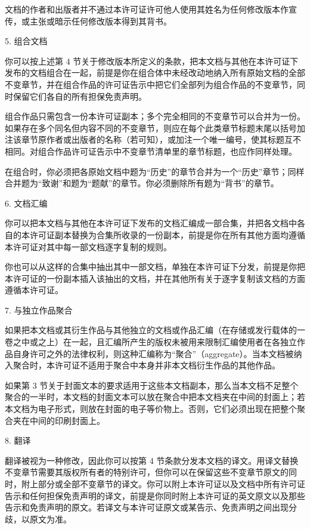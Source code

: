 \documentclass[a4paper]{rapport3}
\begin{document}
文档的作者和出版者并不通过本许可证许可他人使用其姓名为任何修改版本作宣传，或主张或暗示任何修改版本得到其背书。

5. 组合文档

你可以按上述第 4 节关于修改版本所定义的条款，把本文档与其他在本许可证下发布的文档组合在一起，前提是你在组合体中未经改动地纳入所有原始文档的全部不变章节，并在组合作品的许可证告示中把它们全部列为组合作品的不变章节，同时保留它们各自的所有担保免责声明。

组合作品只需包含一份本许可证副本；多个完全相同的不变章节可以合并为一份。如果存在多个同名但内容不同的不变章节，则应在每个此类章节标题末尾以括号加注该章节原作者或出版者的名称（若可知），或加注一个唯一编号，使其标题互不相同。对组合作品许可证告示中不变章节清单里的章节标题，也应作同样处理。

在组合时，你必须把各原始文档中题为“历史”的章节合并为一个“历史”章节；同样合并题为“致谢”和题为“题献”的章节。你必须删除所有题为“背书”的章节。

6. 文档汇编

你可以把本文档与其他在本许可证下发布的文档汇编成一部合集，并把各文档中各自的本许可证副本替换为合集所收录的一份副本，前提是你在所有其他方面均遵循本许可证对其中每一部文档逐字复制的规则。

你也可以从这样的合集中抽出其中一部文档，单独在本许可证下分发，前提是你把本许可证的一份副本插入该抽出的文档，并在其他所有关于逐字复制该文档的方面遵循本许可证。

7. 与独立作品聚合

如果把本文档或其衍生作品与其他独立的文档或作品汇编（在存储或发行载体的一卷之中或之上）在一起，且汇编所产生的版权未被用来限制汇编使用者在各独立作品自身许可之外的法律权利，则这种汇编称为“聚合”（aggregate）。当本文档被纳入聚合时，本许可证不适用于聚合中本身并非本文档衍生作品的其他作品。

如果第 3 节关于封面文本的要求适用于这些本文档副本，那么当本文档不足整个聚合的一半时，本文档的封面文本可以放在聚合中把本文档夹在中间的封面上；若本文档为电子形式，则放在封面的电子等价物上。否则，它们必须出现在把整个聚合夹在中间的印刷封面上。

8. 翻译

翻译被视为一种修改，因此你可以按第 4 节条款分发本文档的译文。用译文替换不变章节需要其版权所有者的特别许可，但你可以在保留这些不变章节原文的同时，附上部分或全部不变章节的译文。你可以附上本许可证以及文档中所有许可证告示和任何担保免责声明的译文，前提是你同时附上本许可证的英文原文以及那些告示和免责声明的原文。若译文与本许可证原文或某告示、免责声明之间出现分歧，以原文为准。
\end{document}
